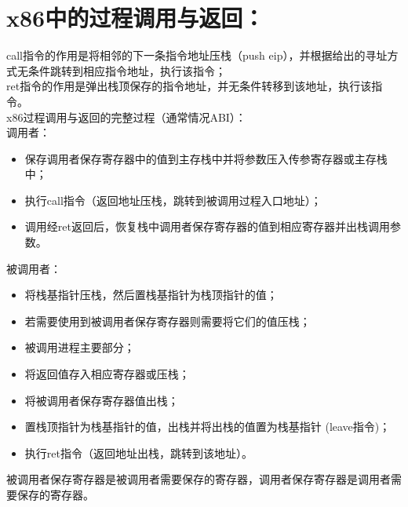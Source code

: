 \documentclass{ctexart}
\begin{document}
\section*{x86中的过程调用与返回：}
\noindent
call指令的作用是将相邻的下一条指令地址压栈（push eip），并根据给出的寻址方式无条件跳转到相应指令地址，执行该指令；\\
ret指令的作用是弹出栈顶保存的指令地址，并无条件转移到该地址，执行该指令。\\
x86过程调用与返回的完整过程（通常情况ABI）：\\
调用者：
\begin{itemize}
\item 保存调用者保存寄存器中的值到主存栈中并将参数压入传参寄存器或主存栈中；
\item 执行call指令（返回地址压栈，跳转到被调用过程入口地址）；
\item 调用经ret返回后，恢复栈中调用者保存寄存器的值到相应寄存器并出栈调用参数。
\end{itemize}
被调用者：
\begin{itemize}
\item 将栈基指针压栈，然后置栈基指针为栈顶指针的值；
\item 若需要使用到被调用者保存寄存器则需要将它们的值压栈；
\item 被调用进程主要部分；
\item 将返回值存入相应寄存器或压栈；
\item 将被调用者保存寄存器值出栈；
\item 置栈顶指针为栈基指针的值，出栈并将出栈的值置为栈基指针 (leave指令)；
\item 执行ret指令（返回地址出栈，跳转到该地址）。
\end{itemize}
被调用者保存寄存器是被调用者需要保存的寄存器，调用者保存寄存器是调用者需要保存的寄存器。
\end{document}

